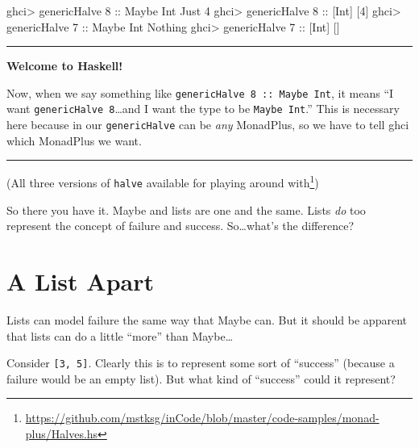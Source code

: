 \documentclass[]{article}
\newenvironment{Shaded}{}{}
\newcommand{\DataTypeTok}[1]{\textcolor[rgb]{0.56,0.13,0.00}{#1}}
\newcommand{\DecValTok}[1]{\textcolor[rgb]{0.25,0.63,0.44}{#1}}
\newcommand{\NormalTok}[1]{#1}
\newcommand{\OperatorTok}[1]{\textcolor[rgb]{0.40,0.40,0.40}{#1}}
\newcommand{\OtherTok}[1]{\textcolor[rgb]{0.00,0.44,0.13}{#1}}
\renewcommand{\href}[2]{#2\footnote{\url{#1}}}
\begin{document}
\begin{Shaded}
\begin{Highlighting}[]
\NormalTok{ghci}\OperatorTok{\textgreater{}}\NormalTok{ genericHalve }\DecValTok{8}\OtherTok{ ::} \DataTypeTok{Maybe} \DataTypeTok{Int}
\DataTypeTok{Just} \DecValTok{4}
\NormalTok{ghci}\OperatorTok{\textgreater{}}\NormalTok{ genericHalve }\DecValTok{8}\OtherTok{ ::}\NormalTok{ [}\DataTypeTok{Int}\NormalTok{]}
\NormalTok{[}\DecValTok{4}\NormalTok{]}
\NormalTok{ghci}\OperatorTok{\textgreater{}}\NormalTok{ genericHalve }\DecValTok{7}\OtherTok{ ::} \DataTypeTok{Maybe} \DataTypeTok{Int}
\DataTypeTok{Nothing}
\NormalTok{ghci}\OperatorTok{\textgreater{}}\NormalTok{ genericHalve }\DecValTok{7}\OtherTok{ ::}\NormalTok{ [}\DataTypeTok{Int}\NormalTok{]}
\NormalTok{[]}
\end{Highlighting}
\end{Shaded}

\begin{center}\rule{0.5\linewidth}{0.5pt}\end{center}

\textbf{Welcome to Haskell!}

Now, when we say something like \texttt{genericHalve\ 8\ ::\ Maybe\ Int}, it
means ``I want \texttt{genericHalve\ 8}\ldots and I want the type to be
\texttt{Maybe\ Int}.'' This is necessary here because in our
\texttt{genericHalve} can be \emph{any} MonadPlus, so we have to tell ghci which
MonadPlus we want.

\begin{center}\rule{0.5\linewidth}{0.5pt}\end{center}

(\href{https://github.com/mstksg/inCode/blob/master/code-samples/monad-plus/Halves.hs}{All
three versions of \texttt{halve} available for playing around with})

So there you have it. Maybe and lists are one and the same. Lists \emph{do} too
represent the concept of failure and success. So\ldots what's the difference?

\section{A List Apart}\label{a-list-apart}

Lists can model failure the same way that Maybe can. But it should be apparent
that lists can do a little ``more'' than Maybe\ldots{}

Consider \texttt{{[}3,\ 5{]}}. Clearly this is to represent some sort of
``success'' (because a failure would be an empty list). But what kind of
``success'' could it represent?
\end{document}
